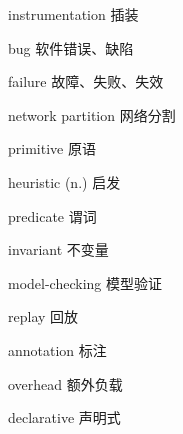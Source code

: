 \begin{denotation}

\item[instrumentation] 插装
\item[bug] 软件错误、缺陷
\item[failure] 故障、失败、失效
\item[network partition] 网络分割
\item[primitive] 原语
\item[heuristic (n.)] 启发
\item[predicate] 谓词
\item[invariant] 不变量
\item[model-checking] 模型验证
\item[replay] 回放
\item[annotation] 标注
\item[overhead] 额外负载
\item[declarative] 声明式

\end{denotation}
